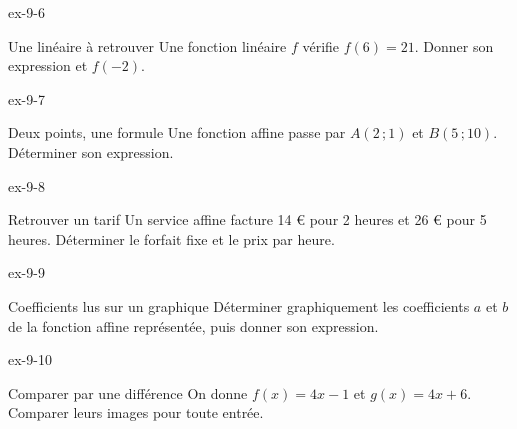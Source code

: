 \clearpage{}
\begin{blocLivre}{ex-9-6}\begin{exercice}[2]{Une linéaire à retrouver}
Une fonction linéaire $f$ vérifie $f(6)=21$. Donner son expression et $f(-2)$.
\end{exercice}\end{blocLivre}
\begin{blocLivre}{ex-9-7}\begin{exercice}[2]{Deux points, une formule}
Une fonction affine passe par $A(2\,;1)$ et $B(5\,;10)$. Déterminer son expression.
\label{fig-ex-9-7}
\end{exercice}\end{blocLivre}
\begin{blocLivre}{ex-9-8}\begin{exercice}[2]{Retrouver un tarif}
Un service affine facture 14 € pour 2 heures et 26 € pour 5 heures. Déterminer le forfait fixe et le prix par heure.
\end{exercice}\end{blocLivre}
\begin{blocLivre}{ex-9-9}\begin{exercice}[2]{Coefficients lus sur un graphique}
Déterminer graphiquement les coefficients $a$ et $b$ de la fonction affine représentée, puis donner son expression.
\label{fig-ex-9-9}
\end{exercice}\end{blocLivre}
\begin{blocLivre}{ex-9-10}\begin{exercice}[2]{Comparer par une différence}
On donne $f(x)=4x-1$ et $g(x)=4x+6$. Comparer leurs images pour toute entrée.
\label{fig-ex-9-10}
\end{exercice}\end{blocLivre}

